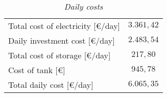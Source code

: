 \begin{table}[H]
\centering
\begin{tabular}{|cc|}
\hline
\rowcolor{bluepoli!40}\multicolumn{2}{|c|}{\textbf{Daily costs}} \\ \hline
\multicolumn{1}{|l|}{Total cost of electricity {[}€/day{]}} & $3.361,42$  \\ \hline
\multicolumn{1}{|l|}{Daily investment cost {[}€/day{]}}   & $2.483,54$  \\ \hline
\multicolumn{1}{|l|}{Total cost of storage {[}€/day{]}}     & $217,80$    \\ \hline
\multicolumn{1}{|l|}{Cost of tank {[}€{]}}                & $945,78$    \\ \hline
\multicolumn{1}{|l|}{Total daily cost {[}€/day{]}}          & $6.065,35$  \\ \hline
\end{tabular}
\caption{\textit{Daily costs}}
\label{tab:crododaily}
\end{table}